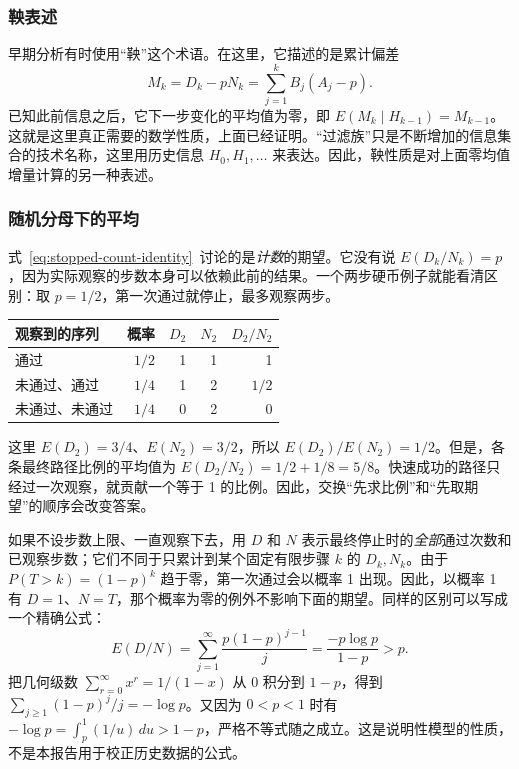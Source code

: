 \subsubsection{鞅表述}
\label{subsec:martingale}
早期分析有时使用“鞅”这个术语。在这里，它描述的是累计偏差
\[
 M_k=D_k-pN_k=\sum_{j=1}^k B_j(A_j-p).
\]
已知此前信息之后，它下一步变化的平均值为零，即 $E(M_k\mid H_{k-1})=M_{k-1}$。这就是这里真正需要的数学性质，上面已经证明。“过滤族”只是不断增加的信息集合的技术名称，这里用历史信息 $H_0,H_1,\ldots$ 来表达。因此，鞅性质是对上面零均值增量计算的另一种表述。

\subsubsection{随机分母下的平均}
式~\eqref{eq:stopped-count-identity}~讨论的是\emph{计数}的期望。它没有说 $E(D_k/N_k)=p$，因为实际观察的步数本身可以依赖此前的结果。一个两步硬币例子就能看清区别：取 $p=1/2$，第一次通过就停止，最多观察两步。
\begin{center}
\begin{tabular}{lrrrr}
\toprule
观察到的序列 & 概率 & $D_2$ & $N_2$ & $D_2/N_2$ \\
\midrule
通过 & $1/2$ & 1 & 1 & 1 \\
未通过、通过 & $1/4$ & 1 & 2 & $1/2$ \\
未通过、未通过 & $1/4$ & 0 & 2 & 0 \\
\bottomrule
\end{tabular}
\end{center}
这里 $E(D_2)=3/4$、$E(N_2)=3/2$，所以 $E(D_2)/E(N_2)=1/2$。但是，各条最终路径比例的平均值为 $E(D_2/N_2)=1/2+1/8=5/8$。快速成功的路径只经过一次观察，就贡献一个等于 1 的比例。因此，交换“先求比例”和“先取期望”的顺序会改变答案。

如果不设步数上限、一直观察下去，用 $D$ 和 $N$ 表示最终停止时的\emph{全部}通过次数和已观察步数；它们不同于只累计到某个固定有限步骤 $k$ 的 $D_k,N_k$。由于 $P(T>k)=(1-p)^k$ 趋于零，第一次通过会以概率 1 出现。因此，以概率 1 有 $D=1$、$N=T$，那个概率为零的例外不影响下面的期望。同样的区别可以写成一个精确公式：
\[
 E(D/N)=\sum_{j=1}^{\infty}\frac{p(1-p)^{j-1}}{j}
 =\frac{-p\log p}{1-p}>p.
\]
把几何级数 $\sum_{r=0}^{\infty}x^r=1/(1-x)$ 从 0 积分到 $1-p$，得到 $\sum_{j\ge1}(1-p)^j/j=-\log p$。又因为 $0<p<1$ 时有 $-\log p=\int_p^1(1/u)\,du>1-p$，严格不等式随之成立。这是说明性模型的性质，不是本报告用于校正历史数据的公式。

